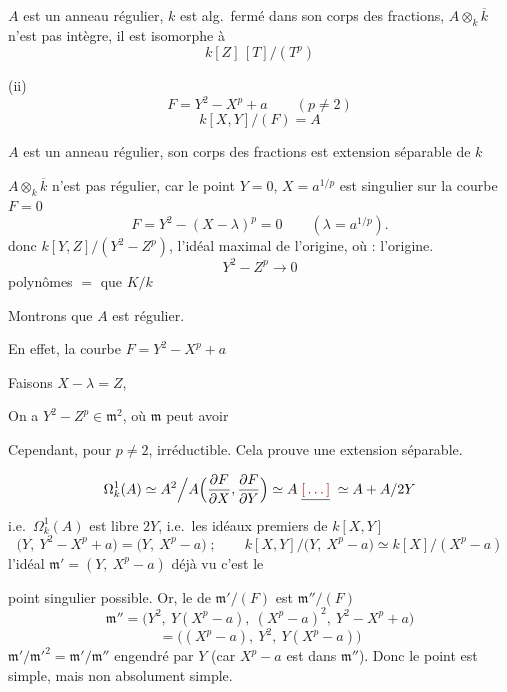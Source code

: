 \documentclass[11pt,a4paper]{article}
\begin{document}
$A$ est un anneau régulier, $k$ est alg.\ fermé dans son corps des fractions,
$A \otimes_{k} \overline{k}$ n'est pas intègre, il est \struck{\ill{}}
isomorphe à
\[
  k[Z]\,[T]/(T^{p})
\]

(ii)
\[
  F = Y^{2} - X^{p} + a \qquad (p \neq 2)
\]
\[
  k[X, Y]/(F) = A
\]

$A$ est un anneau régulier,  son corps des fractions
est extension séparable de $k$

$A \otimes_{k} \overline{k}$ n'est pas régulier, car le point $Y = 0$,
$X = a^{1/p}$ est singulier sur la courbe $F = 0$
\[
  F = Y^{2} - (X - \lambda)^{p} = 0 \qquad (\lambda = a^{1/p}).
\]
\ill{} donc $k[Y, Z]/(Y^{2} - Z^{p})$, \ill{} l'idéal maximal de l'origine,
où  \ill{} : l'origine.
\[
  Y^{2} - Z^{p} \longrightarrow 0
\]
\ill{} polynômes \ill{} \ill{} $=$ \ill{} que $K/k$ \ill{}

Montrons que $A$ est régulier. \ill{}  \ill{}

En effet, la courbe  \ill{} $F = Y^{2} - X^{p} + a$
\ill{}

Faisons $X - \lambda = Z$, \ill{}

On a $Y^{2} - Z^{p} \in \mathfrak{m}^{2}$, où $\mathfrak{m}$ \ill{} \ill{}
\ill{} \ill{} peut avoir \ill{}

Cependant, pour $p \neq 2$, \ill{} irréductible. Cela prouve \ill{} une
extension séparable.

\[
  \Omega^{1}_{k}(A) \simeq A^{2} \Big/ A\Bigl(\frac{\partial F}{\partial X},
  \frac{\partial F}{\partial Y}\Bigr) \simeq A \;\struck{\ill{}}\;
  \simeq A + A/2Y
\]
i.e.\ $\Omega^{1}_{k}(A)$ est \ill{} libre \ill{} $2Y$, i.e.\ les idéaux
\ill{} premiers \ill{} de $k[X, Y]$ \ill{}
\[
  \bigl(Y,\ Y^{2} - X^{p} + a\bigr) = \bigl(Y,\ X^{p} - a\bigr) \;;\qquad
  k[X, Y]/\bigl(Y,\ X^{p} - a\bigr) \simeq k[X]/(X^{p} - a)
\]
\ill{} l'idéal $\mathfrak{m}' = (Y,\ X^{p} - a)$ \ill{} déjà vu \ill{}
c'est \ill{} le

 point singulier possible. Or, le  de
$\mathfrak{m}'/(F)$ est $\mathfrak{m}''/(F)$
\[
  \mathfrak{m}'' = \bigl(Y^{2},\ Y(X^{p} - a),\ (X^{p} - a)^{2},\
  Y^{2} - X^{p} + a\bigr)
\]
\[
  = \bigl((X^{p} - a),\ Y^{2},\ Y(X^{p} - a)\bigr)
\]
\ill{}  \ill{}
$\mathfrak{m}'/\mathfrak{m}'^{2} = \mathfrak{m}'/\mathfrak{m}''$ \ill{}
engendré par $Y$ (car $X^{p} - a$ est dans $\mathfrak{m}''$). Donc le point
est \ill{} simple, mais non absolument simple.
\end{document}

